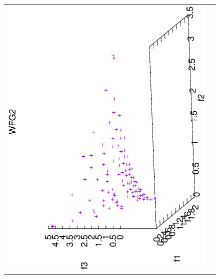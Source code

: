 \begin{figure}[H]
\begin{tabular}{cc}
  \includegraphics[scale=0.3, angle=-90,origin=c]{Figures_Chapter7/Results_Chapter4/Summary_Representative/VSD-MOEA-D/WFG2.eps} \\

\end{tabular}
\end{figure}
